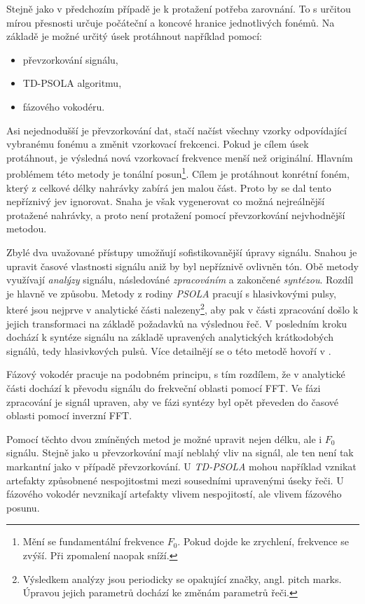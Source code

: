 Stejně jako v předchozím případě je k protažení potřeba zarovnání. To s určitou mírou přesnosti určuje počáteční a koncové hranice jednotlivých fonémů. Na základě je možné určitý úsek protáhnout například pomocí:

\begin{itemize}
  \item převzorkování signálu,
  \item TD-PSOLA algoritmu,
  \item fázového vokodéru.
\end{itemize}

\noindent Asi nejednodušší je převzorkování dat, stačí načíst všechny vzorky odpovídající vybranému fonému a změnit vzorkovací frekcenci. Pokud je cílem úsek protáhnout, je výsledná nová vzorkovací frekvence menší než originální. Hlavním problémem této metody je tonální posun\footnote{Mění se fundamentální frekvence $F_0$. Pokud dojde ke zrychlení, frekvence se zvýší. Při zpomalení naopak sníží.}. Cílem je protáhnout konrétní foném, který z celkové délky nahrávky zabírá jen malou část. Proto by se dal tento nepříznivý jev ignorovat. Snaha je však vygenerovat co možná nejreálnější protažené nahrávky, a proto není protažení pomocí převzorkování nejvhodnější metodou.

Zbylé dva uvažované přístupy umožňují sofistikovanější úpravy signálu. Snahou je upravit časové vlastnosti signálu aniž by byl nepříznivě ovlivněn tón.  Obě metody využívají \textit{analýzy} signálu,  následováné \textit{zpracováním} a zakončené \textit{syntézou}. Rozdíl je hlavně ve způsobu. Metody z rodiny \textit{PSOLA} pracují s hlasivkovými pulsy, které jsou nejprve v analytické části nalezeny\footnote{Výsledkem analýzy jsou periodicky se opakující značky, angl. pitch marks. Úpravou jejich parametrů dochází ke změnám parametrů řeči.}, aby pak v části zpracování došlo k jejich transformaci na základě požadavků na výslednou řeč. V posledním kroku dochází k syntéze signálu na základě upravených analytických krátkodobých signálů, tedy hlasivkových pulsů. Více detailnějí se o této metodě hovoří v \cite{Psutka2006}.

Fázový vokodér pracuje na podobném principu, s tím rozdílem, že v analytické části dochází k převodu signálu do frekveční oblasti pomocí FFT. Ve fázi zpracování je signál upraven, aby ve fázi syntézy byl opět převeden do časové oblasti pomocí inverzní FFT.

Pomocí těchto dvou zmíněných metod je možné upravit nejen délku, ale i $F_0$ signálu. Stejně jako u převzorkování mají neblahý vliv na signál, ale ten není tak markantní jako v případě převzorkování. U \textit{TD-PSOLA} mohou například vznikat artefakty způsobnené nespojitostmi mezi sousedními upravenými úseky řeči. U fázového vokodér nevznikají artefakty vlivem nespojitostí, ale vlivem fázového posunu.

